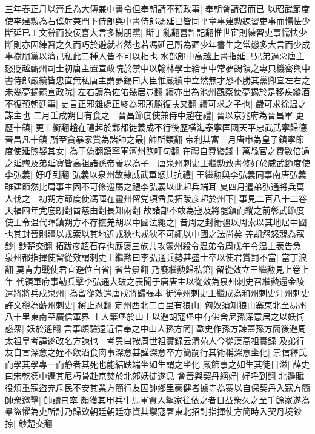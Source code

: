 三年春正月以齊丘為大傅兼中書令但奉朝請不預政事|{
	奉朝會請召而已}
以昭武節度使李建勲為右僕射兼門下侍郎與中書侍郎馮延已皆同平章事建勲練習吏事而懦怯少斷延已工文辭而狡佞喜大言多樹朋黨|{
	斷丁亂翻喜許記翻惟世宦則練習吏事懦怯少斷則亦因練習之久而巧於避就者然也若馮延己所為廼少年書生之常態多大言而少成事樹朋黨以濟己私此二種人皆不可以相也}
水部郎中高越上書指延己兄弟過惡唐主怒貶越蘄州司士初唐主置宣政院於禁中以翰林學士給事中常夢錫領之專典機密與中書侍郎嚴續皆忠直無私唐主謂夢錫曰大臣惟嚴續中立然無才恐不勝其黨卿宜左右之未幾夢錫罷宣政院|{
	左右讀為佐佑幾居豈翻}
續亦出為池州觀察使夢錫於是移疾縱酒不復預朝廷事|{
	史言正邪雜處正終為邪所勝復扶又翻}
續可求之子也|{
	嚴可求徐温之謀主也}
二月壬戌朔日有食之　晉昌節度使兼侍中趙在禮|{
	晉以京兆府為晉昌軍}
更歷十鎮|{
	更工衡翻趙在禮起於鄴都徙義成不行後歷横海泰寧匡國天平忠武武寧歸德晉昌凡十鎮}
所至貪暴家貲為諸帥之最|{
	帥所類翻}
帝利其富三月唐申為皇子鎮寧節度使延煦娶其女|{
	為于偽翻鎮寧軍澶州煦吁句翻}
在禮自費緡錢十萬縣官之費數倍過之延煦及弟延寶皆高祖諸孫帝養以為子　唐泉州刺史王繼勲致書修好於威武節度使李弘義|{
	好呼到翻}
弘義以泉州故隸威武軍怒其抗禮|{
	王繼勲與李弘義同事南唐弘義雖建節然比肩事主固不可修巡屬之禮李弘義以此起兵端耳}
夏四月遣弟弘通將兵萬人伐之　初朔方節度使馮暉在靈州留党項酋長拓跋彦超於州下|{
	事見二百八十二卷天福四年党底朗翻酋慈由翻長知兩翻}
故諸部不敢為寇及將罷鎮而縱之前彰武節度使王令温代暉鎮朔方不存撫羌胡以中國法繩之|{
	昔周之封衛疆以周索以其地居中國也其封晉則疆以戎索以其地近戎狄也戎狄不可繩以中國之法尚矣}
羌胡怨怒競為寇鈔|{
	鈔楚交翻}
拓跋彦超石存也厮褒三族共攻靈州殺令温弟令周戊午令温上表告急　泉州都指揮使留從效謂刺史王繼勲曰李弘通兵勢甚盛士卒以使君賞罰不當|{
	當丁浪翻}
莫肯力戰使君宜避位自省|{
	省昔景翻}
乃廢繼勲歸私第|{
	留從效立王繼勲見上卷上年}
代領軍府事勒兵擊李弘通大破之表聞于唐唐主以從效為泉州刺史召繼勲還金陵遣將將兵戍泉州|{
	為留從效遣唐戍將歸張本}
徙漳州刺史王繼成為和州刺史汀州刺史許文稹為蘄州刺史|{
	稹止忍翻}
定州西北二百里有狼山|{
	匈奴須知狼山寨東北至易州八十里東南至廣信軍界}
土人築堡於山上以避胡寇堡中有佛舍尼孫深意居之以妖術惑衆|{
	妖於遙翻}
言事頗驗遠近信奉之中山人孫方簡|{
	歐史作孫方諫蓋孫方簡後避周太祖皇考諱遂改名方諫也　考異曰按周世祖實録云清苑人今從漢高祖實録}
及弟行友自言深意之姪不飲酒食肉事深意甚謹深意卒方簡嗣行其術稱深意坐化|{
	崇信釋氏而學其學專一而静者其死也能結趺端坐如生謂之坐化}
嚴飾事之如生其徒日滋|{
	薛史曰宋乾德中遷其尼朽骨赴京焚於北郊妖徒遂息}
會晉與契丹絕好|{
	好呼到翻}
北邉賦役煩重寇盜充斥民不安其業方簡行友因帥鄉里豪健者據寺為寨以自保契丹入寇方簡帥衆邀擊|{
	帥讀曰率}
頗獲其甲兵牛馬軍資人挈家往依之者日益衆久之至千餘家遂為羣盜懼為吏所討乃歸欵朝廷朝廷亦資其禦寇署東北招討指揮使方簡時入契丹境鈔掠|{
	鈔楚交翻}
